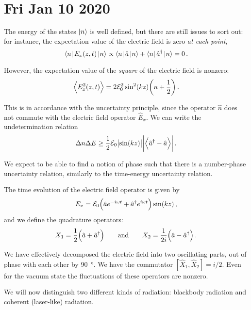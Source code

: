 \documentclass[main.tex]{subfiles}
\begin{document}
\section*{Fri Jan 10 2020}

The energy of the states \(\ket{n}\) is well defined, but there are still issues to sort out: for instance, the expectation value of the electric field is zero \emph{at each point}, 
%
\begin{align}
\bra{n} E_x(z, t) \ket{n} \propto \bra{n} \hat{a} \ket{n} + \bra{n} \hat{a}^\dag  \ket{n} = 0 
\,.
\end{align}

However, the expectation value of the \emph{square} of the electric field is nonzero: 
%
\begin{align}
\expval{E^2_{x} (z, t) } = 2 \mathcal{E}_{0}^2 \sin^2(kz) \qty(n+ \frac{1}{2})
\,.
\end{align}

This is in accordance with the uncertainty principle, since the operator \(\hat{n} \) does not commute with the electric field operator \(\hat{E}_{x}\). We can write the undetermination relation 
%
\begin{align}
\Delta n \Delta E \geq \frac{1}{2} \mathcal{E}_{0} \abs{\sin(kz)} \abs{\expval{\hat{a}^\dag - \hat{a}}}
\,.
\end{align}

We expect to be able to find a notion of phase such that there is a number-phase uncertainty relation, similarly to the time-energy uncertainty relation. 

The time evolution of the electric field operator is given by 
%
\begin{align}
E_{x} = \mathcal{E}_{0} \qty(\hat{a} e^{-i \omega t}  + \hat{a}^\dag e^{i \omega t} )\sin(kz)
\,,
\end{align}
%
and we define the quadrature operators: 
%
\begin{align}
X_{1} = \frac{1}{2} \qty(\hat{a} + \hat{a}^\dag) \qquad \text{and} \qquad
X_{2} = \frac{1}{2i} \qty(\hat{a} - \hat{a}^\dag)
\,.
\end{align}

We have effectively decomposed the electric field into two oscillating parts, out of phase with each other by \SI{90}{\degree}. We have the commutator \([\hat{X}_{1}, \hat{X}_{2}] = i/2\).
Even for the vacuum state the fluctuations of these operators are nonzero. 

We will now distinguish two different kinds of radiation: blackbody radiation and coherent (laser-like) radiation. 
\end{document}
